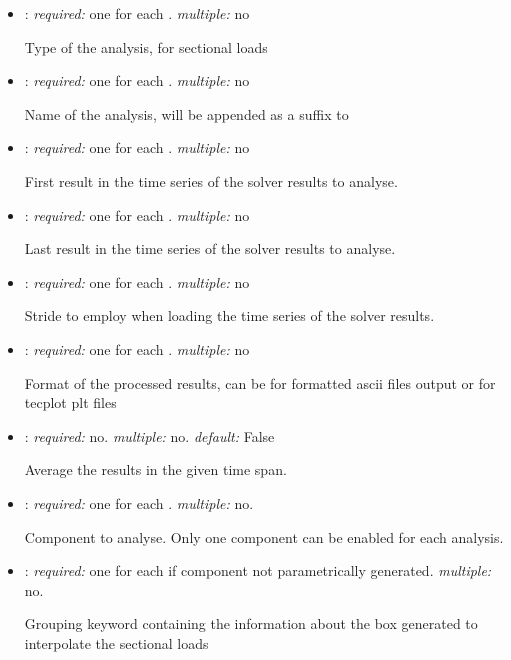 \begin{itemize}
\item {}: \textit{required:} one for each . \textit{multiple:} no

Type of the analysis,  for sectional loads

\item {}: \textit{required:} one for each . \textit{multiple:} no

Name of the analysis, will be appended as a suffix to 

\item {}: \textit{required:} one for each . \textit{multiple:} no

First result in the time series of the solver results to analyse.

\item {}: \textit{required:} one for each . \textit{multiple:} no

Last result in the time series of the solver results to analyse.

\item {}: \textit{required:} one for each . \textit{multiple:} no

Stride to employ when loading the time series of the solver results. 

\item {}: \textit{required:} one for each . \textit{multiple:} no

Format of the processed results, can be  for formatted ascii files output or  for tecplot plt files

\item {}: \textit{required:} no. \textit{multiple:} no. \textit{default:} False

Average the results in the given time span.

\item {}: \textit{required:} one for each . \textit{multiple:} no.

Component to analyse. Only one component can be enabled for each analysis. 

\item {}: \textit{required:} one for each  if component not parametrically generated. \textit{multiple:} no.

Grouping keyword containing the information about the box generated to interpolate the sectional loads


\end{itemize}

